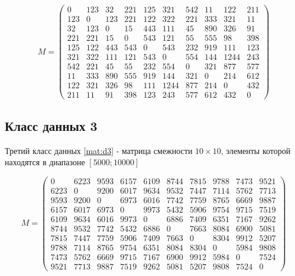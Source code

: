 \documentclass[12pt]{report}
\begin{document}
	\begin{equation}
		\label{mat:d2}
		M = 
		\begin{pmatrix} 
			0& 123& 32& 221& 125& 321& 542& 11& 122& 211\\ 
			123& 0& 123& 221& 122& 322& 221& 333& 321& 11\\ 
			32& 123& 0& 15& 443& 111& 45& 890& 326& 91\\ 
			221& 221& 15& 0& 543& 121& 55& 555& 98& 398\\ 
			125& 122& 443& 543& 0& 543& 232& 919& 111& 123\\
			321& 322& 111& 121& 543& 0& 554& 144& 1244& 243\\ 
			542& 221& 45& 55& 232& 554& 0& 321& 877& 577\\ 
			11& 333& 890& 555& 919& 144& 321& 0& 214& 612\\ 
			122& 321& 326& 98& 111& 1244& 877& 214& 0& 432\\
			211& 11& 91& 398& 123& 243& 577& 612& 432& 0
		\end{pmatrix}
	\end{equation}
	
	\subsection*{Класс данных 3}
	Третий класс данных \ref{mat:d3} - матрица смежности $10\times10$, элементы которой находятся в диапазоне $[5000;10000]$
	
	\begin{equation}
		\label{mat:d3}
		M = 
		\begin{pmatrix} 
			0& 6223& 9593& 6157& 6109& 8744& 7815& 9788& 7473& 9521\\
			6223& 0& 9200& 6017& 9634& 9532& 7447& 7114& 5762& 7713\\
			9593& 9200& 0& 6973& 6016& 7742& 7759& 8765& 6669& 9887\\
			6157& 6017& 6973& 0& 9973& 5432& 5906& 9754& 9715& 7519\\
			6109& 9634& 6016& 9973& 0& 6886& 7409& 6351& 7167& 9262\\
			8744& 9532& 7742& 5432& 6886& 0& 7663& 8084& 6900& 5081\\
			7815& 7447& 7759& 5906& 7409& 7663& 0& 8304& 9912& 5207\\
			9788& 7114& 8765& 9754& 6351& 8084& 8304& 0& 5984& 9808\\
			7473& 5762& 6669& 9715& 7167& 6900& 9912& 5984& 0& 7524\\
			9521& 7713& 9887& 7519& 9262& 5081& 5207& 9808& 7524& 0
		\end{pmatrix}
	\end{equation}
	
\end{document}
